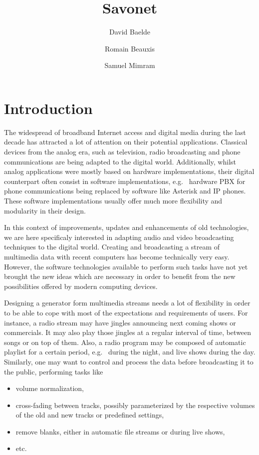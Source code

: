 \documentclass{llncs}
\title{Savonet}
\author{David Baelde \and Romain Beauxis \and Samuel Mimram}
\newcommand{\eg}{e.g.~}
\begin{document}
\maketitle

\section*{Introduction}
The widespread of broadband Internet access and digital media during the last
decade has attracted a lot of attention on their potential applications.
Classical devices from the analog era, such as television, radio broadcasting
and phone communications are being adapted to the digital world. Additionally,
whilst analog applications were mostly based on hardware implementations, their
digital counterpart often consist in software implementations, \eg{} hardware
PBX for phone communications being replaced by software like Asterisk and IP
phones. These software implementations usually offer much more flexibility and
modularity in their design.

In this context of improvements, updates and enhancements of old technologies,
we are here specificaly interested in adapting audio and video broadcasting
techniques to the digital world. Creating and broadcasting a stream of
multimedia data with recent computers has become technically very easy. However,
the software technologies available to perform such tasks have not yet brought
the new ideas which are necessary in order to benefit from the new possibilities
offered by modern computing devices.

Designing a generator form multimedia streams needs a lot of flexibility in
order to be able to cope with most of the expectations and requirements of
users. For instance, a radio stream may have jingles announcing next coming
shows or commercials. It may also play those jingles at a regular interval of
time, between songs or on top of them. Also, a radio program may be composed of
automatic playlist for a certain period, \eg{} during the night, and live shows
during the day. Similarly, one may want to control and process the data before
broadcasting it to the public, performing tasks like
\begin{itemize}
 \item volume normalization,
 \item cross-fading between tracks, possibly parameterized by the respective
   volumes of the old and new tracks or predefined settings,
 \item remove blanks, either in automatic file streams or during live shows,
 \item etc.
\end{itemize}
\end{document}
